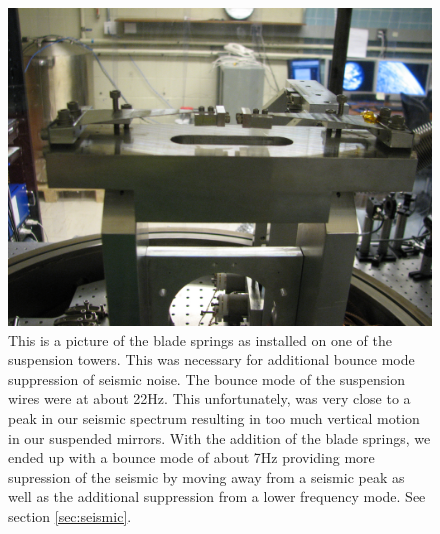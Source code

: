 
\begin{figure}
\centering
  \includegraphics[width=15cm]{./figures/bladesprings.jpg}
  \caption[Blade Spring Modification for Vertical Isolation]{
  This is a picture of the blade springs as installed on one of the suspension
  towers.
  This was necessary for additional bounce mode suppression of seismic noise.
  The bounce mode of the suspension wires were at about 22Hz.
  This unfortunately, was very close to a peak in our seismic spectrum
  resulting in too much vertical motion in our suspended mirrors.
  With the addition of the blade springs, we ended up with a bounce mode of
  about 7Hz providing more supression of the seismic by moving away from a
  seismic peak as well as the additional suppression from a lower frequency
  mode. See section \ref{sec:seismic}.
  }
  \label{fig:blades}
\end{figure}



